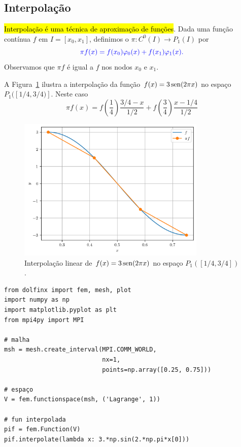 \subsection{Interpolação}

\hl{Interpolação é uma técnica de aproximação de funções}. Dada uma função contínua $f$ em $I=[x_0, x_1]$, definimos o  $\pi: C^0(I)\to P_1(I)$ por
\begin{equation}\color{blue}\pi f (x) = f(x_0)\varphi_0(x) + f(x_1)\varphi_1(x).
\end{equation}
Observamos que $\pi f$ é igual a $f$ nos nodos $x_0$ e $x_1$. 

\begin{ex}\label{ex:interp_lin}
  A Figura~\ref{fig:ex_interp_lin} ilustra a interpolação da função $f(x)=3\operatorname{sen}(2\pi x)$ no espaço $P_1([1/4, 3/4)]$. Neste caso
  \begin{equation}
    \pi f(x) = f\left(\frac{1}{4}\right)\frac{3/4-x}{1/2} + f\left(\frac{3}{4}\right)\frac{x-1/4}{1/2}
  \end{equation}

  \begin{figure}[H]
    \centering
    \includegraphics[width=0.8\textwidth]{./cap_mef1d/dados/fig_ex_interp_lin/fig}
    \caption{Interpolação linear de $f(x)=3\operatorname{sen}(2\pi x)$ no espaço $P_1([1/4, 3/4])$.}
    \label{fig:ex_interp_lin}
  \end{figure}


\begin{lstlisting}[caption=interp0.py]
from dolfinx import fem, mesh, plot
import numpy as np
import matplotlib.pyplot as plt
from mpi4py import MPI

# malha
msh = mesh.create_interval(MPI.COMM_WORLD,
                           nx=1,
                           points=np.array([0.25, 0.75]))

# espaço
V = fem.functionspace(msh, ('Lagrange', 1))

# fun interpolada
pif = fem.Function(V)
pif.interpolate(lambda x: 3.*np.sin(2.*np.pi*x[0]))
\end{lstlisting}
\end{ex}

